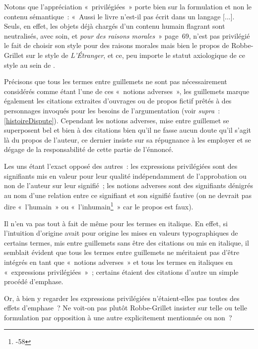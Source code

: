 \documentclass[12pt, a4paper]{article}
\begin{document}
Notons que l'appréciation «~privilégiées~» porte bien sur la formulation et non le contenu sémantique~: «~Aussi le livre n’est-il pas écrit dans un langage [...]. Seuls, en effet, les objets déjà chargés d’un contenu humain flagrant sont neutralisés, avec soin, et \textit{pour des raisons morales}~» page~69, n'est pas privilégié le fait de choisir son style pour des raisons morales mais bien le propos de Robbe-Grillet sur le style de \textit{L'Étranger}, et ce, peu importe le statut axiologique de ce style au sein de \punr{}.

Précisons que tous les termes entre guillemets ne sont pas nécessairement considérés comme étant l'une de ces «~notions adverses~», les guillemets marque également les citations extraites d'ouvrages ou de propos fictif prêtés à des personnages invoqués pour les besoins de l'argumentation (voir \textit{supra}~: \ref{histoireDispute}). Cependant les notions adverses, mise entre guillemet se superposent bel et bien à des citations bien qu'il ne fasse aucun doute qu'il s'agit là du propos de l'auteur, ce dernier insiste sur sa répugnance à les employer et se dégage de la responsabilité de cette partie de l'énnoncé. 

Les uns étant l'exact opposé des autres~: les expressions privilégiées sont des signifiants mis en valeur pour leur qualité indépendamment de l'approbation ou non de l'auteur sur leur signifié~; les notions adverses sont des signifiants dénigrés au nom d'une relation entre ce signifiant et son signifié fautive (on ne devrait pas dire «~l'humain~» ou «~l'inhumain\footnote{-58}~» car le propos est faux).


Il n'en va pas tout à fait de même pour les termes en italique. En effet, si l'intuition d'origine avait pour origine les mises en valeurs typographiques de certains termes, mis entre guillemets sans être des citations ou mis en italique, il semblait évident que tous les termes entre guillemets ne méritaient pas d'être intégrés en tant que «~notions adverses~» et tous les termes en italiques en «~expressions privilégiées~»~; certains étaient des citations d'autre un simple procédé d'emphase.

Or, à bien y regarder les expressions privilégiées n'étaient-elles pas toutes des effets d'emphase~? Ne voit-on pas plutôt Robbe-Grillet insister sur telle ou telle formulation par opposition à une autre explicitement mentionnée ou non~? 
\end{document}
